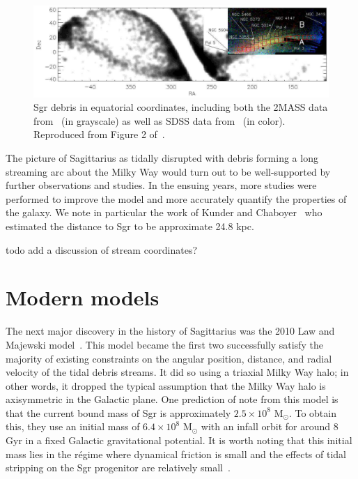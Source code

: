 \begin{figure}
    \centering 
    \includegraphics[width=0.95\linewidth]{figs/belokurov2006-2.png}
    \caption{%
        Sgr debris in equatorial coordinates, including both the 2MASS data
        from~\cite{majewski_two_2003} (in grayscale) as well as SDSS data
        from~\cite{belokurov_field_2006} (in color). Reproduced from Figure 2
        of~\cite{belokurov_field_2006}.
    }
    \label{fig:belokurov2006}
\end{figure}

The picture of Sagittarius as tidally disrupted with debris forming a long
streaming arc about the Milky Way would turn out to be well-supported by
further observations and studies. In the ensuing years, more studies were
performed to improve the model and more accurately quantify the properties of
the galaxy. We note in particular the work of Kunder and
Chaboyer~\cite{kunder_distance_2009} who estimated the distance to Sgr to be
approximate 24.8 kpc.

todo add a discussion of stream coordinates?

\hypertarget{modern-models}{%
\section{Modern models}\label{modern-models}}

The next major discovery in the history of Sagittarius was the 2010 Law and
Majewski model~\cite{law_sagittarius_2010}. This model became the first two
successfully satisfy the majority of existing constraints on the angular
position, distance, and radial velocity of the tidal debris streams. It did so
using a triaxial Milky Way halo; in other words, it dropped the typical
assumption that the Milky Way halo is axisymmetric in the Galactic plane. One
prediction of note from this model is that the current bound mass of Sgr is
approximately \(2.5 \times 10^8\) M\(_\odot\). To obtain this, they use an
initial mass of \(6.4 \times 10^8\) M\(_\odot\) with an infall orbit for
around 8 Gyr in a fixed Galactic gravitational potential. It is worth noting
that this initial mass lies in the régime where dynamical friction is small
and the effects of tidal stripping on the Sgr progenitor are relatively
small~\cite{dierickx_predicted_2017}.

